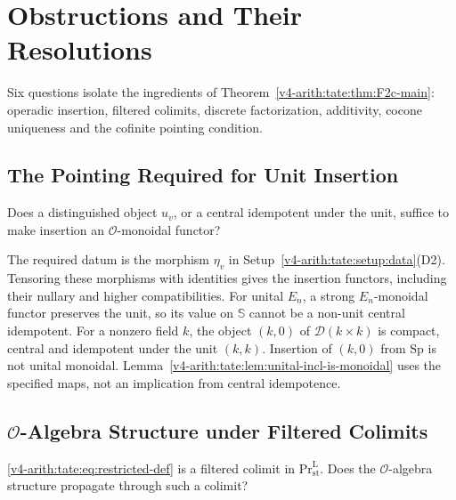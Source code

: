 \section{Obstructions and Their Resolutions}
\label{v4-arith:tate:table}

Six questions isolate the ingredients of
Theorem~\ref{v4-arith:tate:thm:F2c-main}: operadic insertion, filtered
colimits, discrete factorization, additivity, cocone uniqueness
and the cofinite pointing condition.

\subsection{The Pointing Required for Unit Insertion}

\begin{obstruction}
Does a distinguished object \(u_v\), or a central idempotent under
the unit, suffice to make insertion an \(\mathcal O\)-monoidal
functor?
\end{obstruction}

\begin{correction}
The required datum is the morphism \(\eta_v\) in
Setup~\ref{v4-arith:tate:setup:data}(D2). Tensoring these morphisms
with identities gives the insertion functors, including their
nullary and higher compatibilities. For unital \(E_n\), a strong
\(E_n\)-monoidal functor preserves the unit, so its value on
\(\mathbb S\) cannot be a non-unit central idempotent. For a nonzero
field \(k\), the object \((k,0)\) of \(\mathcal D(k\times k)\)
is compact, central and idempotent under the unit \((k,k)\).
Insertion of \((k,0)\) from \(\mathrm{Sp}\) is not unital monoidal.
Lemma~\ref{v4-arith:tate:lem:unital-incl-is-monoidal} uses the
specified maps, not an implication from central idempotence.
\end{correction}

\subsection{\(\mathcal{O}\)-Algebra Structure under Filtered Colimits}

\begin{obstruction}
\eqref{v4-arith:tate:eq:restricted-def} is a filtered colimit in
\(\mathrm{Pr}^{\mathrm{L}}_{\mathrm{st}}\). Does the
\(\mathcal{O}\)-algebra structure propagate through such a colimit?
\end{obstruction}

